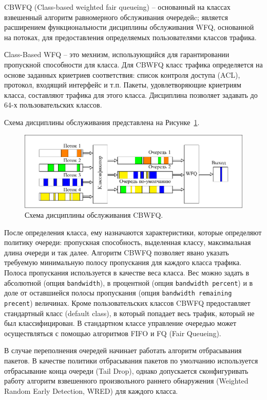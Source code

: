     CBWFQ (Class-based weighted fair queueing) -- основанный на классах взвешенный алгоритм равномерного обслуживания 
    очередейc\cite{Vagesna}; является расширением функциональности дисциплины обслуживания WFQ,
    основанной на потоках, для предоставления определяемых пользователями классов трафика. 

    Сlass-Based WFQ -- это мехнизм, использующийся для гарантировании пропускной способности
    для класса. Для CBWFQ класс трафика определяется на основе заданных криетриев
    соответствия: список контроля доступа (ACL), протокол, входящий интерфейс и т.п. Пакеты,
    удовлетворяющие криетриям класса, составляют трафика для этого класса. Дисциплина
    позволяет задавать до 64-х пользовательских классов.
		
	Схема дисциплины обслуживания представлена на Рисунке~\ref{pic:cbwfqscheme}. 

 	\begin{figure}[ht!]
		\center
    	\includegraphics[scale=1.1]{pdfimages/cbwfq.pdf}
		\caption{Схема дисциплины обслуживания CBWFQ.}
		\label{pic:cbwfqscheme}
	\end{figure}   

    После определения класса, ему назначаются характеристики, которые определяют
    политику очереди: пропускная способность, выделенная классу, максимальная
    длина очереди и так далее. Алгоритм CBWFQ позволяет явано указать требуемую минимальную
    полосу пропускания для каждого класса трафика. Полоса пропускания используется
    в качестве веса класса. Вес можно задать в абсолютной (опция \texttt{bandwidth}),
    в процентной (опция \texttt{bandwidth percent}) и в доле от оставшиейся
    полосы пропускания (опция \texttt{bandwidth remaining precent}) величинах.
    Кроме пользовательских классов CBWFQ предоставляет стандартный класс (default class),
    в который попадает весь трафик, который не был классифицирован. В стандартном классе
    управление очередью может осуществляться с помощью алгоритмов FIFO и FQ (Fair Queueing). \cite{ciscoguide} 

    В случае переполнения очередей начинает работать алгоритм отбрасывания пакетов.
    В качестве политики отбрасывания пакетов по умолчанию используется отбрасывание конца
    очереди (Tail Drop), однако допускается сконфигуривать работу
    алгоритм взвешенного произвольного раннего обнаружения (Weighted Random Early Detection, WRED)
    для каждого класса.\cite{ciscoguide}



